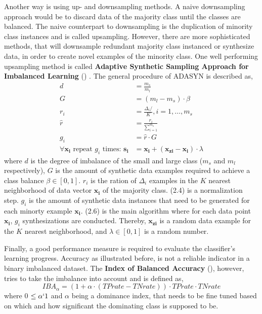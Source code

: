 Another way is using up- and downsampling methods. A naive downsampling approach would be to discard data of the majority class until the classes are balanced. The naive counterpart to downsampling is the duplication of minority class instances and is called upsampling. However, there are more sophisticated methods, that will downsample redundant majority class instanced or synthesize data, in order to create novel examples of the minority class. One well performing upsampling method is called \textbf{Adaptive Synthetic Sampling Approach for Imbalanced Learning} () \citep{He2008}.
The general procedure of ADASYN is described as,
\begin{align}
  d &= \frac{m_s}{m_l} \\
  G &= (m_l - m_s) \cdot \beta \\
  r_i &= \frac{\Delta_i/}{K}, i=1, \dots, m_s \\
  \hat{r} &= \frac{r_i}{\sum_{i=1}^{m_s}} \\
  g_i &= \hat{r} \cdot G \\
  \forall \boldsymbol{x_i} \text{ repeat } g_i \text{ times: } \boldsymbol{s_i} &= \boldsymbol{x_i} + (\boldsymbol{x_{zi}} - \boldsymbol{x_i}) \cdot \lambda
\end{align}
where $d$ is the degree of imbalance of the small and large class ($m_s$ and $m_l$ respectively), $G$ is the amount of synthetic data examples required to achieve a class balance $\beta \in [0,1]$. $r_i$ is the ration of $\Delta_i$ examples in the $K$ nearest neighborhood of data vector $\boldsymbol{x_i}$ of the majority class. (2.4) is a normalization step. $g_i$ is the amount of synthetic data instances that need to be generated for each minorty example $\boldsymbol{x_i}$.
(2.6) is the main algorithm where for each data point $\boldsymbol{x_i}$, $g_i$ synthesizations are conducted. Thereby, $\boldsymbol{x_{zi}}$ is a random data example for the $K$ nearest neighborhood, and $\lambda \in [0,1]$ is a random number.

Finally, a good performance measure is required to evaluate the classifier's learning progress. Accuracy as illustrated before, is not a reliable indicator in a binary imbalanced dataset. The \textbf{Index of Balanced Accuracy} (), however, tries to take the imbalance into account and is defined as,
\[IBA_{\alpha} = (1 + \alpha \cdot (TPrate - TNrate)) \cdot TPrate \cdot TNrate \]
where  0 $\leq \alpha \lq 1$ and $\alpha$ being a dominance index, that needs to be fine tuned based on which and how significant the dominating class is supposed to be.

